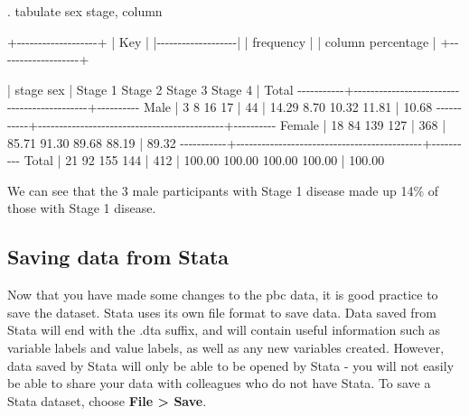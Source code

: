 \documentclass[
]{memoir}
\newenvironment{Shaded}{\begin{snugshade}}{\end{snugshade}}
\newcommand{\NormalTok}[1]{#1}
\begin{document}
\begin{Shaded}
\begin{Highlighting}[]
\NormalTok{. tabulate sex stage, column}

\NormalTok{+{-}{-}{-}{-}{-}{-}{-}{-}{-}{-}{-}{-}{-}{-}{-}{-}{-}{-}{-}+}
\NormalTok{| Key               |}
\NormalTok{|{-}{-}{-}{-}{-}{-}{-}{-}{-}{-}{-}{-}{-}{-}{-}{-}{-}{-}{-}|}
\NormalTok{|     frequency     |}
\NormalTok{| column percentage |}
\NormalTok{+{-}{-}{-}{-}{-}{-}{-}{-}{-}{-}{-}{-}{-}{-}{-}{-}{-}{-}{-}+}

\NormalTok{           |                    stage}
\NormalTok{       sex |   Stage 1    Stage 2    Stage 3    Stage 4 |     Total}
\NormalTok{{-}{-}{-}{-}{-}{-}{-}{-}{-}{-}{-}+{-}{-}{-}{-}{-}{-}{-}{-}{-}{-}{-}{-}{-}{-}{-}{-}{-}{-}{-}{-}{-}{-}{-}{-}{-}{-}{-}{-}{-}{-}{-}{-}{-}{-}{-}{-}{-}{-}{-}{-}{-}{-}{-}{-}+{-}{-}{-}{-}{-}{-}{-}{-}{-}{-}}
\NormalTok{      Male |         3          8         16         17 |        44 }
\NormalTok{           |     14.29       8.70      10.32      11.81 |     10.68 }
\NormalTok{{-}{-}{-}{-}{-}{-}{-}{-}{-}{-}{-}+{-}{-}{-}{-}{-}{-}{-}{-}{-}{-}{-}{-}{-}{-}{-}{-}{-}{-}{-}{-}{-}{-}{-}{-}{-}{-}{-}{-}{-}{-}{-}{-}{-}{-}{-}{-}{-}{-}{-}{-}{-}{-}{-}{-}+{-}{-}{-}{-}{-}{-}{-}{-}{-}{-}}
\NormalTok{    Female |        18         84        139        127 |       368 }
\NormalTok{           |     85.71      91.30      89.68      88.19 |     89.32 }
\NormalTok{{-}{-}{-}{-}{-}{-}{-}{-}{-}{-}{-}+{-}{-}{-}{-}{-}{-}{-}{-}{-}{-}{-}{-}{-}{-}{-}{-}{-}{-}{-}{-}{-}{-}{-}{-}{-}{-}{-}{-}{-}{-}{-}{-}{-}{-}{-}{-}{-}{-}{-}{-}{-}{-}{-}{-}+{-}{-}{-}{-}{-}{-}{-}{-}{-}{-}}
\NormalTok{     Total |        21         92        155        144 |       412 }
\NormalTok{           |    100.00     100.00     100.00     100.00 |    100.00 }
\end{Highlighting}
\end{Shaded}

We can see that the 3 male participants with Stage 1 disease made up 14\% of those with Stage 1 disease.

\hypertarget{saving-data-from-stata}{%
\subsection{Saving data from Stata}\label{saving-data-from-stata}}

Now that you have made some changes to the pbc data, it is good practice to save the dataset. Stata uses its own file format to save data. Data saved from Stata will end with the .dta suffix, and will contain useful information such as variable labels and value labels, as well as any new variables created. However, data saved by Stata will only be able to be opened by Stata - you will not easily be able to share your data with colleagues who do not have Stata. To save a Stata dataset, choose \textbf{File \textgreater{} Save}.
\end{document}
